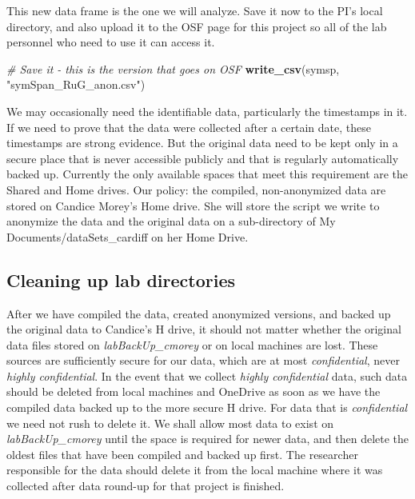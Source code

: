\documentclass[12pt,]{book}
\newenvironment{Shaded}{\begin{snugshade}}{\end{snugshade}}
\newcommand{\KeywordTok}[1]{\textcolor[rgb]{0.13,0.29,0.53}{\textbf{#1}}}
\newcommand{\StringTok}[1]{\textcolor[rgb]{0.31,0.60,0.02}{#1}}
\newcommand{\CommentTok}[1]{\textcolor[rgb]{0.56,0.35,0.01}{\textit{#1}}}
\newcommand{\NormalTok}[1]{#1}
\theoremstyle{definition}
\theoremstyle{definition}
\theoremstyle{definition}
\theoremstyle{remark}
\begin{document}
This new data frame is the one we will analyze. Save it now to the PI's
local directory, and also upload it to the OSF page for this project so
all of the lab personnel who need to use it can access it.

\begin{Shaded}
\begin{Highlighting}[]
\CommentTok{# Save it - this is the version that goes on OSF}
\KeywordTok{write_csv}\NormalTok{(symsp, }\StringTok{"symSpan_RuG_anon.csv"}\NormalTok{)}
\end{Highlighting}
\end{Shaded}

We may occasionally need the identifiable data, particularly the
timestamps in it. If we need to prove that the data were collected after
a certain date, these timestamps are strong evidence. But the original
data need to be kept only in a secure place that is never accessible
publicly and that is regularly automatically backed up. Currently the
only available spaces that meet this requirement are the Shared and Home
drives. Our policy: the compiled, non-anonymized data are stored on
Candice Morey's Home drive. She will store the script we write to
anonymize the data and the original data on a sub-directory of My
Documents/dataSets\_cardiff on her Home Drive.

\subsection{Cleaning up lab
directories}\label{cleaning-up-lab-directories}

After we have compiled the data, created anonymized versions, and backed
up the original data to Candice's H drive, it should not matter whether
the original data files stored on \emph{labBackUp\_cmorey} or on local
machines are lost. These sources are sufficiently secure for our data,
which are at most \emph{confidential}, never \emph{highly confidential}.
In the event that we collect \emph{highly confidential} data, such data
should be deleted from local machines and OneDrive as soon as we have
the compiled data backed up to the more secure H drive. For data that is
\emph{confidential} we need not rush to delete it. We shall allow most
data to exist on \emph{labBackUp\_cmorey} until the space is required
for newer data, and then delete the oldest files that have been compiled
and backed up first. The researcher responsible for the data should
delete it from the local machine where it was collected after data
round-up for that project is finished.
\end{document}
